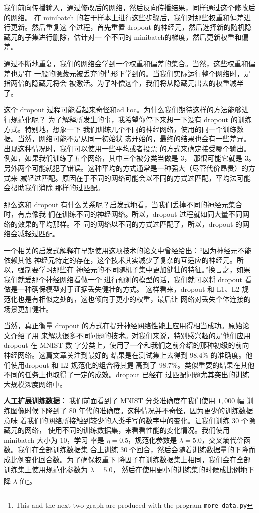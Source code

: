 我们前向传播输入，通过修改后的网络，然后反向传播结果，同样通过这个修改后的网络。
在 minibatch 的若干样本上进行这些步骤后，我们对那些权重和偏差进行更新。然后重复这
个过程，首先重置 dropout 的神经元，然后选择新的随机隐藏元的子集进行删除，估计对一
个不同的 minibatch的梯度，然后更新权重和偏差。

通过不断地重复，我们的网络会学到一个权重和偏差的集合。当然，这些权重和偏差也是在
一般的隐藏元被丢弃的情形下学到的。当我们实际运行整个网络时，是指两倍的隐藏元将会
被激活。为了补偿这个，我们将从隐藏元出去的权重减半了。

这个 dropout 过程可能看起来奇怪和ad hoc。为什么我们期待这样的方法能够进行规范化呢？
为了解释所发生的事，我希望你停下来想一下没有 dropout 的训练方式。特别地，想象一下
我们训练几个不同的神经网络，使用的同一个训练数据。当然，网络可能不是从同一初始状
态开始的，最终的结果也会有一些差异。出现这种情况时，我们可以使用一些平均或者投票
的方式来确定接受哪个输出。例如，如果我们训练了五个网络，其中三个被分类当做是 $3$，
那很可能它就是
$3$。另外两个可能就犯了错误。这种平均的方式通常是一种强大（尽管代价昂贵）的方式来
减轻过匹配。原因在于不同的网络可能会以不同的方式过匹配，平均法可能会帮助我们消除
那样的过匹配。

那么这和 dropout 有什么关系呢？启发式地看，当我们丢掉不同的神经元集合时，有点像我
们在训练不同的神经网络。所以，dropout 过程就如同大量不同网络的效果的平均那样。不
同的网络以不同的方式过匹配了，所以，dropout 的网络会减轻过匹配。

一个相关的启发式解释在早期使用这项技术的论文中曾经给出：“因为神经元不能依赖其他
神经元特定的存在，这个技术其实减少了复杂的互适应的神经元。所以，强制要学习那些在
神经元的不同随机子集中更加健壮的特征。”换言之，如果我们就爱那个神经网络看做一个
进行预测的模型的话，我们就可以将 dropout 看做是一种确保模型对于证据丢失健壮的方式。
这样看来，dropout 和 L1、L2 规范化也是有相似之处的，这也倾向于更小的权重，最后让
网络对丢失个体连接的场景更加健壮。

当然，真正衡量 dropout 的方式在提升神经网络性能上应用得相当成功。原始论文介绍了用
来解决很多不同问题的技术。对我们来说，特别感兴趣的是他们应用 dropout 在 MNIST 数
字分类上，使用了一个和我们之前介绍的那种初级的前向神经网络。这篇文章关注到最好的
结果是在测试集上去得到 98.4\% 的准确度。他们使用dropout 和 L2 规范化的组合将其提
高到了 98.7\%。类似重要的结果在其他不同的任务上也取得了一定的成效。dropout 已经在
过匹配问题尤其突出的训练大规模深度网络中。

\textbf{人工扩展训练数据：} 我们前面看到了 MNIST 分类准确度在我们使用 $1,000$ 幅
训练图像时候下降到了 $80$ 年代的准确度。这种情况并不奇怪，因为更少的训练数据意味
着我们的网络所接触到较少的人类手写的数字中的变化。让我们训练 $30$ 个隐藏元的网络，
使用不同的训练数据集，来看看性能的变化情况。我们使用 minibatch 大小为 $10$，学习
率是 $\eta=0.5$，规范化参数是 $\lambda=5.0$，交叉熵代价函数。我们在全部训练数据集
合上训练 30 个回合，然后会随着训练数据量的下降而成比例变化回合数。为了确保权重下
降因子在训练数据集上相同，我们会在全部训练集上使用规范化参数为 $\lambda = 5.0$，
然后在使用更小的训练集的时候成比例地下降 $\lambda$ 值\footnote{This and the next
  two graph are produced with the program \lstinline!more_data.py!}。

